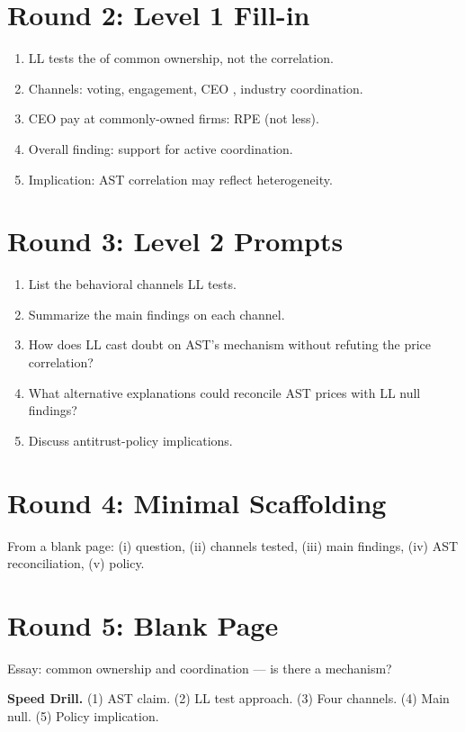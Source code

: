 \documentclass[11pt]{article}
\newcommand{\blank}[1]{\underline{\hspace{#1}}}
\begin{document}
\section*{Round 2: Level 1 Fill-in}
\begin{enumerate}
\item LL tests the \blank{2cm} of common ownership, not the correlation.
\item Channels: voting, engagement, CEO \blank{1.5cm}, industry coordination.
\item CEO pay at commonly-owned firms: \blank{1cm} RPE (not less).
\item Overall finding: \blank{1cm} support for active coordination.
\item Implication: AST correlation may reflect \blank{2cm} heterogeneity.
\end{enumerate}

\section*{Round 3: Level 2 Prompts}
\begin{enumerate}
\item List the behavioral channels LL tests.
\item Summarize the main findings on each channel.
\item How does LL cast doubt on AST's mechanism without refuting the price correlation?
\item What alternative explanations could reconcile AST prices with LL null findings?
\item Discuss antitrust-policy implications.
\end{enumerate}

\section*{Round 4: Minimal Scaffolding}
From a blank page: (i) question, (ii) channels tested, (iii) main findings, (iv) AST reconciliation, (v) policy.

\section*{Round 5: Blank Page}
Essay: common ownership and coordination --- is there a mechanism?

\vspace{6pt}
\begin{drillbox}
\textbf{Speed Drill.} (1) AST claim. (2) LL test approach. (3) Four channels. (4) Main null. (5) Policy implication.
\end{drillbox}
\end{document}
